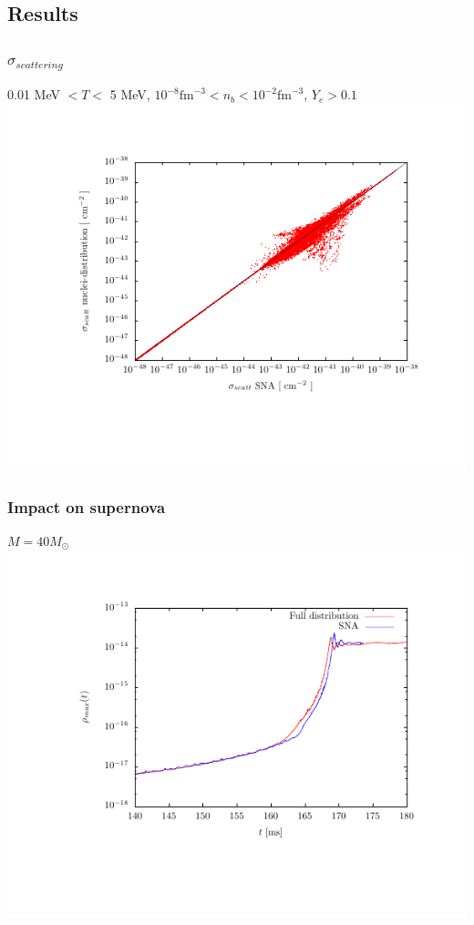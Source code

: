 \documentclass{beamer}
\begin{document}
\subsection{Results}

\begin{frame}
\frametitle{$\sigma_{scattering}$}
0.01 MeV $< T <$ 5 MeV,  $10^{-8} \textrm{fm}^{-3} < n_b < 10^{-2} \textrm{fm}^{-3}$, $Y_e > 0.1$
\vspace{-3em}
\includegraphics[width=1.1\textwidth]{plots/scattering_xs.pdf}
\end{frame}

\begin{frame}
\frametitle{Impact on supernova}
$M = \textrm{40} M_{\odot}$
\vspace{-3em}
\includegraphics[width=1.1\textwidth]{plots/rho.pdf}
\end{frame}
\end{document}
